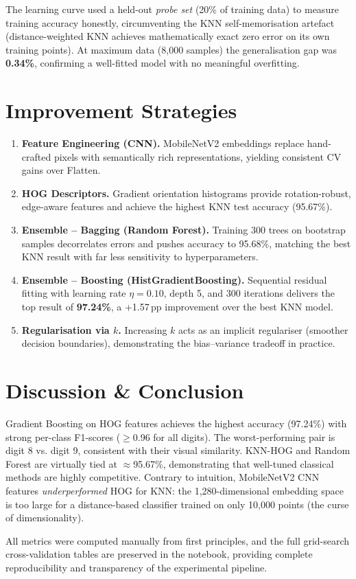 \documentclass[10pt,twocolumn]{article}
\begin{document}
The learning curve used a held-out \emph{probe set} (20\% of training data)
to measure training accuracy honestly, circumventing the KNN self-memorisation
artefact (distance-weighted KNN achieves mathematically exact zero error on its
own training points).  At maximum data (8{,}000 samples) the generalisation gap
was \textbf{0.34\%}, confirming a well-fitted model with no meaningful overfitting.

\section{Improvement Strategies}

\begin{enumerate}[noitemsep,topsep=2pt,leftmargin=*]
  \item \textbf{Feature Engineering (CNN).}  MobileNetV2 embeddings replace hand-crafted
    pixels with semantically rich representations, yielding consistent CV gains over Flatten.
  \item \textbf{HOG Descriptors.}  Gradient orientation histograms provide rotation-robust,
    edge-aware features and achieve the highest KNN test accuracy (95.67\%).
  \item \textbf{Ensemble – Bagging (Random Forest).}  Training 300 trees on bootstrap
    samples decorrelates errors and pushes accuracy to 95.68\%, matching the best KNN
    result with far less sensitivity to hyperparameters.
  \item \textbf{Ensemble – Boosting (HistGradientBoosting).}  Sequential residual fitting
    with learning rate $\eta=0.10$, depth 5, and 300 iterations delivers the top result
    of \textbf{97.24\%}, a +1.57\,pp improvement over the best KNN model.
  \item \textbf{Regularisation via $k$.}  Increasing $k$ acts as an implicit regulariser
    (smoother decision boundaries), demonstrating the bias–variance tradeoff in practice.
\end{enumerate}

\section{Discussion \& Conclusion}
Gradient Boosting on HOG features achieves the highest accuracy (97.24\%) with strong
per-class F1-scores ($\geq$0.96 for all digits).  The worst-performing pair is digit 8
vs. digit 9, consistent with their visual similarity.  KNN-HOG and Random Forest are
virtually tied at $\approx$95.67\%, demonstrating that well-tuned classical methods are
highly competitive.  Contrary to intuition, MobileNetV2 CNN features \emph{underperformed}
HOG for KNN: the 1{,}280-dimensional embedding space is too large for a distance-based
classifier trained on only 10{,}000 points (the curse of dimensionality).

All metrics were computed manually from first principles, and the full grid-search
cross-validation tables are preserved in the notebook, providing complete reproducibility
and transparency of the experimental pipeline.
\end{document}
